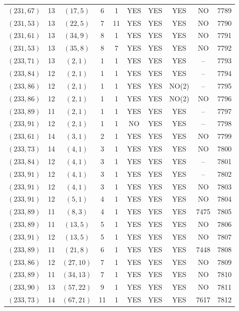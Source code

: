 \begin{longtable}{|c|c|c|c|c|c|c|c|c|c|}
$(231, 67)$ & 13 & $(17, 5)$ & 6 & 1 & YES & YES & YES & NO & 7789\\
$(231, 53)$ & 13 & $(22, 5)$ & 7 & 11 & YES & YES & YES & NO & 7790\\
$(231, 61)$ & 13 & $(34, 9)$ & 8 & 1 & YES & YES & YES & NO & 7791\\
$(231, 53)$ & 13 & $(35, 8)$ & 8 & 7 & YES & YES & YES & NO & 7792\\
$(233, 71)$ & 13 & $(2, 1)$ & 1 & 1 & YES & YES & YES & -- & 7793\\
$(233, 84)$ & 12 & $(2, 1)$ & 1 & 1 & YES & YES & YES & -- & 7794\\
$(233, 86)$ & 12 & $(2, 1)$ & 1 & 1 & YES & YES & NO(2) & -- & 7795\\
$(233, 86)$ & 12 & $(2, 1)$ & 1 & 1 & YES & YES & NO(2) & NO & 7796\\
$(233, 89)$ & 11 & $(2, 1)$ & 1 & 1 & YES & YES & YES & -- & 7797\\
$(233, 91)$ & 12 & $(2, 1)$ & 1 & 1 & NO & YES & YES & -- & 7798\\
$(233, 61)$ & 14 & $(3, 1)$ & 2 & 1 & YES & YES & YES & NO & 7799\\
$(233, 73)$ & 14 & $(4, 1)$ & 3 & 1 & YES & YES & YES & NO & 7800\\
$(233, 84)$ & 12 & $(4, 1)$ & 3 & 1 & YES & YES & YES & -- & 7801\\
$(233, 91)$ & 12 & $(4, 1)$ & 3 & 1 & YES & YES & YES & -- & 7802\\
$(233, 91)$ & 12 & $(4, 1)$ & 3 & 1 & YES & YES & YES & NO & 7803\\
$(233, 91)$ & 12 & $(5, 1)$ & 4 & 1 & YES & YES & YES & NO & 7804\\
$(233, 89)$ & 11 & $(8, 3)$ & 4 & 1 & YES & YES & YES & 7475 & 7805\\
$(233, 89)$ & 11 & $(13, 5)$ & 5 & 1 & YES & YES & YES & NO & 7806\\
$(233, 91)$ & 12 & $(13, 5)$ & 5 & 1 & YES & YES & YES & NO & 7807\\
$(233, 89)$ & 11 & $(21, 8)$ & 6 & 1 & YES & YES & YES & 7448 & 7808\\
$(233, 86)$ & 12 & $(27, 10)$ & 7 & 1 & YES & YES & YES & NO & 7809\\
$(233, 89)$ & 11 & $(34, 13)$ & 7 & 1 & YES & YES & YES & NO & 7810\\
$(233, 90)$ & 13 & $(57, 22)$ & 9 & 1 & YES & YES & YES & NO & 7811\\
$(233, 73)$ & 14 & $(67, 21)$ & 11 & 1 & YES & YES & YES & 7617 & 7812\\

\end{longtable}
